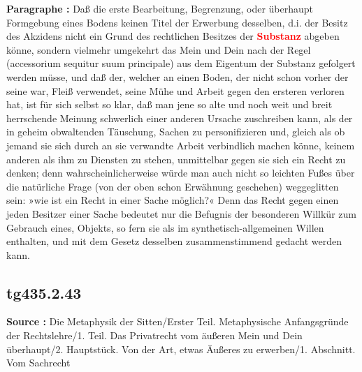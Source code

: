 \documentclass[a4paper,12pt,twoside]{book}
\newcommand{\match}[1]{\textcolor{red}{\textbf{#1}}}
\begin{document}
	\textbf{Paragraphe : }Daß die erste Bearbeitung, Begrenzung, oder überhaupt Formgebung eines Bodens keinen Titel der Erwerbung desselben, d.i. der Besitz des Akzidens nicht ein Grund des rechtlichen Besitzes der \match{Substanz} abgeben könne, sondern vielmehr umgekehrt das Mein und Dein nach der Regel (accessorium sequitur suum principale) aus dem Eigentum der Substanz gefolgert werden müsse, und daß der, welcher an einen Boden, der nicht schon vorher der seine war, Fleiß verwendet, seine Mühe und Arbeit gegen den ersteren verloren hat, ist für sich selbst so klar, daß man jene so alte und noch weit und breit herrschende Meinung schwerlich einer anderen Ursache zuschreiben kann, als der in geheim obwaltenden Täuschung, Sachen zu personifizieren und, gleich als ob jemand sie sich durch an sie verwandte Arbeit verbindlich machen könne, keinem anderen als ihm zu Diensten zu stehen, unmittelbar gegen sie sich ein Recht zu denken; denn wahrscheinlicherweise würde man auch nicht so leichten Fußes über die natürliche Frage (von der oben schon Erwähnung geschehen) weggeglitten sein: »wie ist ein Recht in einer Sache möglich?« Denn das Recht gegen einen jeden Besitzer einer Sache bedeutet nur die Befugnis der besonderen Willkür zum Gebrauch eines, Objekts, so fern sie als im synthetisch-allgemeinen Willen enthalten, und mit dem Gesetz desselben zusammenstimmend gedacht werden kann. 
	
	\subsection*{tg435.2.43} 
	\textbf{Source : }Die Metaphysik der Sitten/Erster Teil. Metaphysische Anfangsgründe der Rechtslehre/1. Teil. Das Privatrecht vom äußeren Mein und Dein überhaupt/2. Hauptstück. Von der Art, etwas Äußeres zu erwerben/1. Abschnitt. Vom Sachrecht\\  
	
\end{document}
